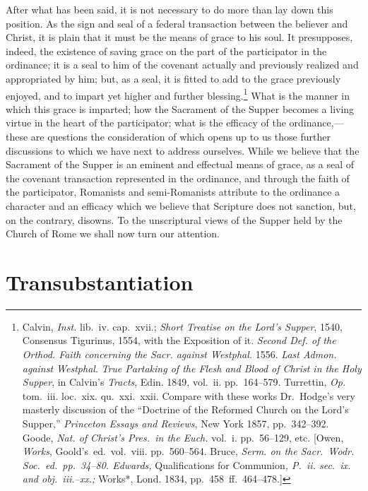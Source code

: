 \documentclass[
  english,
]{book}
\begin{document}
After what has been said, it is not necessary to do more than lay down this position. As the sign and seal of a federal transaction between the believer and Christ, it is plain that it must be the means of grace to his soul. It presupposes, indeed, the existence of saving grace on the part of the participator in the ordinance; it is a seal to him of the covenant actually and previously realized and appropriated by him; but, as a seal, it is fitted to add to the grace previously enjoyed, and to impart yet higher and further blessing.\footnote{Calvin, \emph{Inst.} lib.~iv. cap.~xvii.; \emph{Short Treatise on the Lord's Supper}, 1540, Consensus Tigurinus, 1554, with the Exposition of it. \emph{Second Def. of the Orthod. Faith concerning the Sacr. against Westphal.} 1556. \emph{Last Admon. against Westphal}. \emph{True Partaking of the Flesh and Blood of Christ in the Holy Supper}, in Calvin's \emph{Tracts}, Edin. 1849, vol.~ii. pp.~164--579. Turrettin, \emph{Op.} tom.~iii. loc.~xix. qu.~xxi.~xxii. Compare with these works Dr.~Hodge's very masterly discussion of the ``Doctrine of the Reformed Church on the Lord's Supper,'' \emph{Princeton Essays and Reviews}, New York 1857, pp.~342--392. Goode, \emph{Nat. of Christ's Pres.~in the Euch.} vol.~i. pp.~56--129, etc. {[}Owen, \emph{Works}, Goold's~ed.~vol.~viii. pp.~560--564. Bruce, \emph{Serm. on the Sacr.~Wodr. Soc.~ed.~pp.~34--80. Edwards, }Qualifications for Communion\emph{, P.~ii. sec.~ix. and obj.~iii.--xx.; }Works*, Lond. 1834, pp.~458~ff.~464--478.{]}} What is the manner in which this grace is imparted; how the Sacrament of the Supper becomes a living virtue in the heart of the participator; what is the efficacy of the ordinance,---these are questions the consideration of which opens up to us those further discussions to which we have next to address ourselves. While we believe that the Sacrament of the Supper is an eminent and effectual means of grace, as a seal of the covenant transaction represented in the ordinance, and through the faith of the participator, Romanists and semi-Romanists attribute to the ordinance a character and an efficacy which we believe that Scripture does not sanction, but, on the contrary, disowns. To the unscriptural views of the Supper held by the Church of Rome we shall now turn our attention.

\hypertarget{transubstantiation}{%
\section{Transubstantiation}\label{transubstantiation}}
\end{document}
